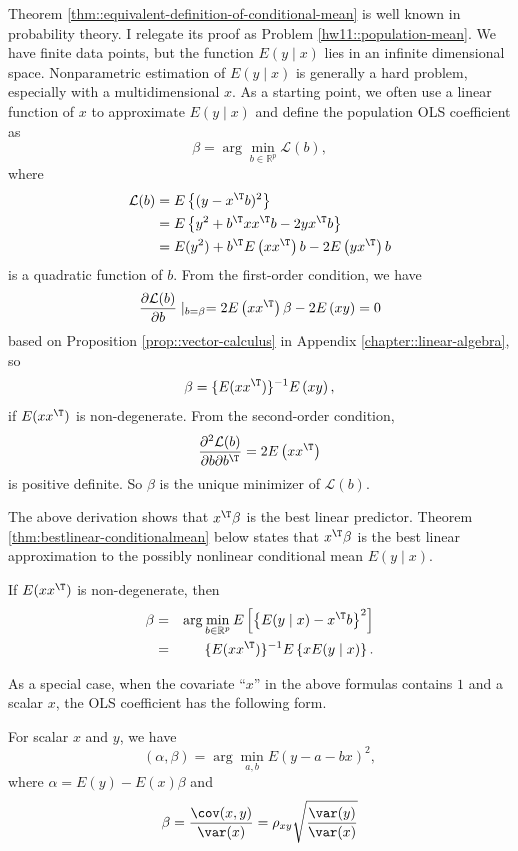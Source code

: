  

Theorem \ref{thm::equivalent-definition-of-conditional-mean} is well known in probability theory. I relegate its proof as  Problem \ref{hw11::population-mean}. 
We have finite data points, but the function $E(y\mid x)$ lies in
an infinite dimensional space. Nonparametric estimation of $E(y\mid x)$
is generally a hard problem, especially with a multidimensional $x$.
As a starting point, we often use a linear function of $x$ to approximate
$E(y\mid x)$ and define the population OLS coefficient as
\[
\beta=\arg\min_{b\in\mathbb{R}^{p}} \mathcal{L}(b) ,
\]
where
\begin{align*}
\mathcal{L}(b) & =E\left\{ (y-x^{\T}b)^{2}\right\} \\
 & =E\left\{ y^{2}+b^{\T}xx^{\T}b-2yx^{\T}b\right\} \\
 & =E(y^{2})+b^{\T}E\left(xx^{\T}\right)b-2E\left(yx^{\T}\right)b 
\end{align*}
 is a quadratic function of $b$. From the first-order condition,
we have
\[
\frac{\partial\mathcal{L}(b)}{\partial b}\mid_{b=\beta}=2E\left(xx^{\T}\right)\beta-2E\left(xy\right)=0
\]
based on Proposition \ref{prop::vector-calculus} in Appendix \ref{chapter::linear-algebra}, 
so
\begin{equation}
\label{eq::pols-formula}
\beta= \{ E(xx^{\T}) \} ^{-1}E\left(xy\right) , 
\end{equation}
if $E(xx^{\T})$ is non-degenerate. 
From the second-order condition, 
\[
\frac{\partial^{2}\mathcal{L}(b)}{\partial b\partial b^{\T}}=2E\left(xx^{\T}\right) 
\]
is positive definite. 
So $\beta$ is the unique minimizer of $\mathcal{L}(b)$. 


The above derivation shows that $x^{\T}\beta$ is the best linear predictor. Theorem \ref{thm:bestlinear-conditionalmean} below states  that $x^{\T}\beta$ is
the best linear approximation to the possibly nonlinear conditional mean $E(y\mid x).$
\begin{theorem}
\label{thm:bestlinear-conditionalmean}
If $E(xx^{\T})$ is non-degenerate, then
\begin{eqnarray*}
\beta &=& \arg\min_{b\in\mathbb{R}^{p}}E\left[\left\{ E(y\mid x)-x^{\T}b\right\} ^{2}\right] \\
&=& \{ E(xx^{\T} ) \} ^{-1}E\left\{ xE(y\mid x)\right\} .
\end{eqnarray*}
\end{theorem}
 



As a special case, when the covariate ``$x$'' in the above formulas contains $1$ and a scalar $x$,
the OLS coefficient has the following form.
\begin{corollary}
\label{corollary:scalar-pop-ols}
For scalar $x$ and $y$, we have 
\[
(\alpha,\beta)=\arg\min_{a,b}E(y-a-bx)^{2},
\]
where $\alpha=E(y)-E(x)\beta$ and 
\[
\beta=\frac{\cov(x,y)}{\var(x)} = \rho_{xy} \sqrt{   \frac{\var(y)}{\var(x)}  }
\]
\end{corollary}

